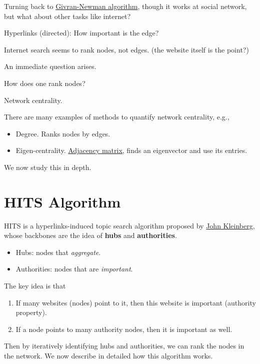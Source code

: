 \begin{prev}
	Turning back to \hyperref[algo:Girvan-Newman-algorithm]{Givran-Newman algorithm}, though it works at social network, but what about other tasks like
	internet?
	\begin{problem}
	Hyperlinks (directed): How important is the edge?
	\end{problem}
	\begin{answer}
		Internet search seems to rank nodes, not edges. (the website itself is the point?)
	\end{answer}

	An immediate question arises.

	\begin{problem}
	How does one rank nodes?
	\end{problem}
	\begin{answer}
		Network centrality.
	\end{answer}
\end{prev}
\begin{eg}
	There are many examples of methods to quantify network centrality, e.g.,
	\begin{itemize}
		\item Degree. Ranks nodes by edges.
		\item Eigen-centrality. \hyperref[def:adjacency-matrix]{Adjacency matrix}, finds an eigenvector and use its entries.
	\end{itemize}
\end{eg}

We now study this in depth.

\chapter{HITS Algorithm}
HITS is a hyperlinks-induced topic search algorithm proposed by \href{https://en.wikipedia.org/wiki/Jon_Kleinberg}{John Kleinberg}, whose backbones are the
idea of \textbf{hubs} and \textbf{authorities}.
\begin{itemize}
	\item Hubs: nodes that \emph{aggregate}.
	\item Authorities: nodes that are \emph{important}.
\end{itemize}

The key idea is that
\begin{enumerate}
	\item If many websites (nodes) point to it, then this website is important (authority property).
	\item If a node points to many authority nodes, then it is important as well.
\end{enumerate}
Then by iteratively identifying hubs and authorities, we can rank the nodes in the network. We now describe in detailed how this algorithm works.

